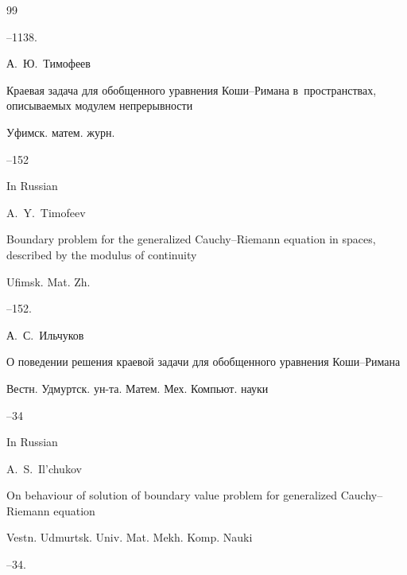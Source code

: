 \begin{thebibliography}{99}

--1138.





\by А.~Ю.~Тимофеев

\paper Краевая задача для обобщенного уравнения Коши--Римана в~пространствах, описываемых модулем непрерывности

\jour Уфимск. матем. журн.




--152


\misctransl

\lang In Russian

\by A.~Y.~Timofeev

\paper Boundary problem for the generalized Cauchy--Riemann equation in spaces, described by the modulus of continuity

\jour Ufimsk. Mat. Zh.




--152.




\by А.~С.~Ильчуков

\paper О поведении решения краевой задачи для обобщенного уравнения Коши--Римана

\jour Вестн. Удмуртск. ун-та. Матем. Мех. Компьют. науки



--34


\misctransl

\lang In Russian

\by A.~S.~Il'chukov

\paper On behaviour of solution of boundary value problem for generalized Cauchy--Riemann equation

\jour Vestn. Udmurtsk. Univ. Mat. Mekh. Komp. Nauki



--34.




\end{thebibliography}
